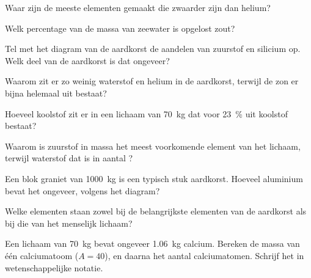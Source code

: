 \begin{exercise}[$\star$]\label{exo:g9:elements-universe-earth:3}
Waar zijn de meeste elementen gemaakt die zwaarder zijn dan helium?
\end{exercise}

\begin{exercise}[$\star$]\label{exo:g9:elements-universe-earth:4}
Welk percentage van de massa van zeewater is opgelost zout?
\end{exercise}

\begin{exercise}[$\star\star$]\label{exo:g9:elements-universe-earth:5}
Tel met het diagram van de aardkorst de aandelen van zuurstof en
silicium op. Welk deel van de aardkorst is dat ongeveer?
\end{exercise}

\begin{exercise}[$\star\star$]\label{exo:g9:elements-universe-earth:6}
Waarom zit er zo weinig waterstof en helium in de aardkorst, terwijl de
zon er bijna helemaal uit bestaat?
\end{exercise}

\begin{exercise}[$\star\star$]\label{exo:g9:elements-universe-earth:7}
Hoeveel koolstof zit er in een lichaam van \qty{70}{kg} dat voor
\qty{23}{\percent} uit koolstof bestaat?
\end{exercise}

\begin{exercise}[$\star\star$]\label{exo:g9:elements-universe-earth:8}
Waarom is zuurstof in massa het meest voorkomende element van het
lichaam, terwijl waterstof dat is in aantal ?
\end{exercise}

\begin{exercise}[$\star\star$]\label{exo:g9:elements-universe-earth:9}
Een blok graniet van \qty{1000}{kg} is een typisch stuk aardkorst.
Hoeveel aluminium bevat het ongeveer, volgens het diagram?
\end{exercise}

\begin{exercise}[$\star\star$]\label{exo:g9:elements-universe-earth:10}
Welke elementen staan zowel bij de belangrijkste elementen van de
aardkorst als bij die van het menselijk lichaam?
\end{exercise}

\begin{exercise}[$\star\star\star$]\label{exo:g9:elements-universe-earth:11}
Een lichaam van \qty{70}{kg} bevat ongeveer \qty{1.06}{kg} calcium.
Bereken de massa van één calciumatoom ($A = 40$), en daarna het aantal
calciumatomen. Schrijf het in wetenschappelijke notatie.
\end{exercise}

